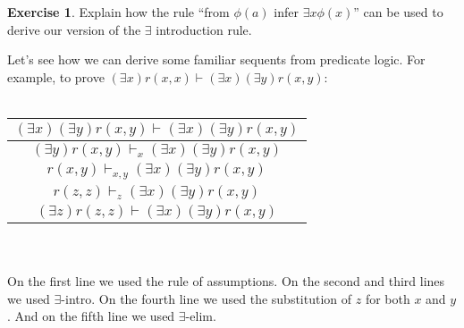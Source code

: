 \documentclass[10pt,fleqn]{article}
\theoremstyle{definition}
\newtheorem{exercise}[prop]{Exercise}
\theoremstyle{remark}
\newcommand{\2}{\mathscr}
\begin{document}
\begin{exercise} Explain how the rule ``from $\phi (a)$ infer $\exists
  x\phi (x)$'' can be used to derive our version of the $\exists$
  introduction rule. \end{exercise}

Let's see how we can derive some familiar sequents from predicate
logic.  For example, to prove $(\exists x)r(x,x)\vdash (\exists
x)(\exists y)r(x,y)$: \\ \\ 
\begin{tabular}{c}
  $(\exists x)(\exists y)r(x,y) \vdash (\exists x)(\exists y)r(x,y)$ \\
  \hline
  $(\exists y)r(x,y) \vdash _x (\exists x)(\exists y)r(x,y)$ \\ \hline
  $r(x,y) \vdash _{x,y}(\exists x)(\exists y)r(x,y)$  \\ \hline 
  $r(z,z) \vdash _z (\exists x)(\exists y)r(x,y)$ \\ \hline 
  $(\exists z)r(z,z) \vdash (\exists x)(\exists y)r(x,y)$ \end{tabular}
\\ \\ 
On the first line we used the rule of assumptions.  On the second and
third lines we used $\exists$-intro.  On the fourth line we used the
substitution of $z$ for both $x$ and $y$.  And on the fifth line we
used $\exists$-elim.

\newcommand{\vd}{\vdash}
\end{document}

